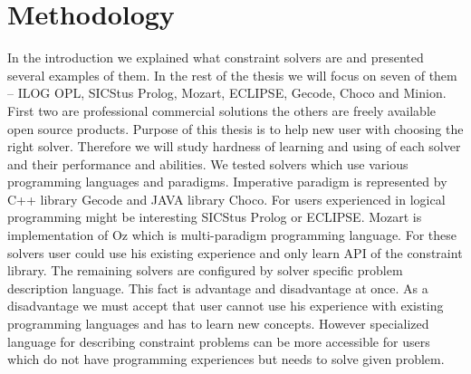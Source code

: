 \chapter{Methodology}
\thispagestyle{myheadings}

In the introduction we explained what constraint solvers are and presented several examples of them. In the rest of the thesis we will focus on seven of them -- ILOG OPL, SICStus Prolog, Mozart, ECLIPSE, Gecode, Choco and Minion. First two are professional commercial solutions the others are freely available open source products. Purpose of this thesis is to help new user with choosing the right solver. Therefore we will study hardness of learning and using of each solver and their performance and abilities. We tested solvers which use various programming languages and paradigms. Imperative paradigm is represented by C++ library Gecode and JAVA library Choco. For users experienced in logical programming might be interesting SICStus Prolog or ECLIPSE. Mozart is implementation of Oz which is multi-paradigm programming language. For these solvers user could use his existing experience and only learn API of the constraint library. The remaining solvers are configured by solver specific problem description language. This fact is advantage and disadvantage at once. As a disadvantage we must accept that user cannot use his experience with existing programming languages and has to learn new concepts. However specialized language for describing constraint problems can be more accessible for users which do not have programming experiences but needs to solve given problem.

